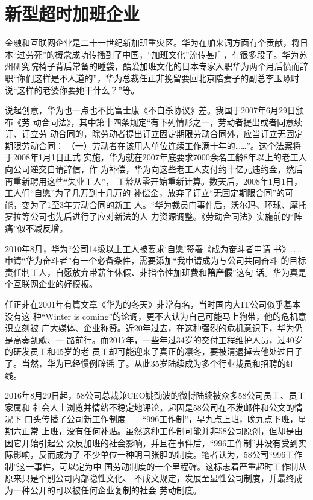 \section{新型超时加班企业}

金融和互联网企业是二十一世纪新加班重灾区。华为在舶来词方面有个贡献，将日
本“过劳死”的概念成功传播到了中国，“加班文化”流传甚广，有很多段子。华为苏
州研究院椅子背后常备的睡袋，酷爱加班文化的日本专家入职华为两个月后愤而辞
职“你们这样是不人道的”，华为总裁任正非挽留要回北京陪妻子的副总李玉琢时
说“这样的老婆你要她干什么？”等。

说起创意，华为也一点也不比富士康《不自杀协议》差。我国于2007年6月29日颁布《劳
动合同法》，其中第十四条规定“有下列情形之一，劳动者提出或者同意续订、订立劳
动合同的，除劳动者提出订立固定期限劳动合同外，应当订立无固定期限劳动合同：
（一）劳动者在该用人单位连续工作满十年的……”。这个法案将于2008年1月1日正式
实施，华为就在2007年底要求7000余名工龄8年以上的老工人向公司递交自请辞信，作
为补偿，华为向这些老工人支付约十亿元违约金，然后再重新聘用这些“失业工人”，
工龄从零开始重新计算。数天后，2008年1月1日，工人们“自愿”为了几万到十几万的
补偿金，放弃了订立“无固定期限合同”的可能，变为了1至3年劳动合同的新工
人。“华为裁员门事件后，沃尔玛、环球、摩托罗拉等公司也先后进行了应对新法的人
力资源调整。《劳动合同法》实施前的“阵痛”似不减反增。\cite{huaweimaiduan}

2010年8月，华为“公司14级以上工人被要求`自愿'签署《成为奋斗者申请
书》……申请“华为奋斗者”有一个必备条件，需要添加“我申请成为与公司共同奋斗
的目标责任制工人，自愿放弃带薪年休假、非指令性加班费和\textbf{陪产假}”这句
话。\cite{huaweifendou}华为真是个互联网企业的好模板。

任正非在2001年有篇文章《华为的冬天》非常有名，当时国内大IT公司似乎基本没有这
种“Winter is coming”的论调，更不大认为自己可能马上狗带，他的危机意识立刻被
广大媒体、企业称赞。近20年过去，在这种强烈的危机意识下，华为仍是高奏凯歌、一
路前行。而2017年，一些年过34岁的交付工程维护人员，过40岁的研发员工和45岁的老
员工却可能迎来了真正的凛冬，要被清退掉去他处过日子了。当然，华为已经惯例辟谣
了。从此35岁陆续成为多个行业裁员和招聘的红线。

2016年8月29日起，58公司总裁兼CEO姚劲波的微博陆续被众多58公司员工、员工家属和
社会人士浏览并情绪不稳定地评论\cite{tai58}，起因是58公司在不发邮件和公文的情况下
口头传播了公司新工作制度——“996工作制”，早九点上班，晚九点下班，星期六正常
上班，没有任何补贴。虽然这种工作制可能并非58公司原创，但却是由因它开始引起公
众反加班的社会影响，并且在事件后，“996工作制”并没有受到实际影响，反而成为了
不少单位一种明目张胆的制度。笔者认为，58公司“996工作制”这一事件，可以定为中
国劳动制度的一个里程碑。这标志着严重超时工作制从原来只是个别公司内部隐性文化、
不成文规定，发展至显性公司制度，并最终成为一种公开的可以被任何企业复制的社会
劳动制度。

